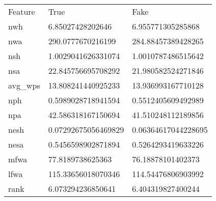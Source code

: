 \begin{table}[]
\begin{tabular}{lll}
Feature  & True                & Fake                \\
nwh      & 6.85027428202646    & 6.955771305285868   \\
nwa      & 290.0777670216199   & 284.88457389428265  \\
nsh      & 1.0029041626331074  & 1.0010787486515642  \\
nsa      & 22.845756695708292  & 21.980582524271846  \\
avg\_wps & 13.808241440925233  & 13.936993167710128  \\
nph      & 0.5989028718941594  & 0.5512405609492989  \\
npa      & 42.586318167150694  & 41.510248112189856  \\
nesh     & 0.07292675056469829 & 0.06364617044228695 \\
nesa     & 0.5456598902871894  & 0.5264293419633226  \\
mfwa     & 77.8189738625363    & 76.18878101402373   \\
lfwa     & 115.33656018070346  & 114.54476806903992  \\
rank     & 6.073294236850641   & 6.404319827400244  
\end{tabular}
\end{table}